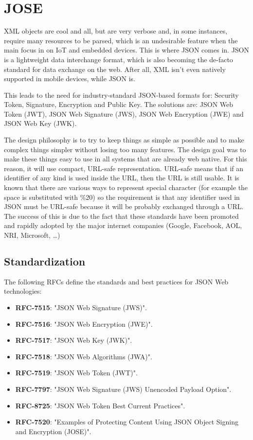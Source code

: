 \chapter{JOSE}
XML objects are cool and all, but are very verbose and, in some
instances, require many resources to be parsed, which is an
undesirable feature when the main focus in on IoT and embedded 
devices. This is where JSON comes in. JSON is a lightweight data
interchange format, which is also becoming the de-facto standard
for data exchange on the web. After all, XML isn't even natively
supported in mobile devices, while JSON is.

This leads to the need for industry-standard JSON-based formats for:
Security Token, Signature, Encryption and Public Key. The solutions
are: JSON Web Token (JWT), JSON Web Signature (JWS), JSON Web
Encryption (JWE) and JSON Web Key (JWK).

The design philosophy is to try to keep things as simple as possible
and to make complex things simpler without losing too many features.
The design goal was to make these things easy to use in all systems
that are already web native. For this reason, it will use compact,
URL-safe representation. URL-safe means that if an identifier of any
kind is used inside the URL, then the URL is still usable. It is known
that there are various ways to represent special character (for
example the space is substituted with \%20) so the requirement is that
any identifier used in JSON must be URL-safe because it will be
probably exchanged through a URL. The success of this is due to the
fact that these standards have been promoted and rapidly adopted by
the major internet companies (Google, Facebook, AOL, NRI, Microsoft,
\dots)

\section*{Standardization}

The following RFCs define the standards and best practices for JSON
Web technologies:
\begin{itemize}
    \item \textbf{RFC-7515}: "JSON Web Signature (JWS)".
    \item \textbf{RFC-7516}: "JSON Web Encryption (JWE)".
    \item \textbf{RFC-7517}: "JSON Web Key (JWK)".
    \item \textbf{RFC-7518}: "JSON Web Algorithms (JWA)".
    \item \textbf{RFC-7519}: "JSON Web Token (JWT)".
    \item \textbf{RFC-7797}: "JSON Web Signature (JWS) Unencoded
      Payload Option".
    \item \textbf{RFC-8725}: "JSON Web Token Best Current Practices".
    \item \textbf{RFC-7520}: "Examples of Protecting Content Using
      JSON Object Signing and Encryption (JOSE)".
\end{itemize}

